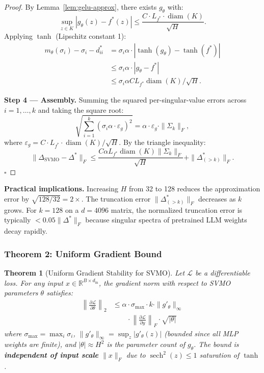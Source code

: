 \documentclass{scpe}
\newtheorem{theorem}{Theorem}[section]
\newcommand{\RR}{\mathbb{R}}
\newcommand{\sech}{\operatorname{sech}}
\newcommand{\diam}{\operatorname{diam}}
\begin{document}
\begin{proof}
By Lemma~\ref{lem:gelu-approx}, there exists $g_\theta$ with:
\begin{equation}
\sup_{z \in K} |g_\theta(z) - f^*(z)| \leq \frac{C \cdot L_{f^*} \cdot \diam(K)}{\sqrt{H}}.
\end{equation}
Applying $\tanh$ (Lipschitz constant 1):
\begin{align}
m_\theta(\sigma_i) - \sigma_i - d_{ii}^*
&= \sigma_i \alpha \cdot |\tanh(g_\theta) - \tanh(f^*)| \nonumber\\
&\leq \sigma_i \alpha \cdot |g_\theta - f^*| \nonumber\\
&\leq \sigma_i \alpha C L_{f^*} \diam(K) / \sqrt{H}.
\end{align}

\textbf{Step 4 --- Assembly.}
Summing the squared per-singular-value errors across $i=1,\dots,k$ and taking the square root:
\begin{equation}
\sqrt{\sum_{i=1}^k (\sigma_i \alpha \cdot \varepsilon_g)^2} = \alpha \cdot \varepsilon_g \cdot \|\Sigma_k\|_F,
\end{equation}
where $\varepsilon_g = C \cdot L_{f^*} \cdot \diam(K) / \sqrt{H}$. By the triangle inequality:
\begin{equation}
\|\Delta_{\text{SVMO}} - \Delta^*\|_F \leq \frac{C \alpha L_{f^*} \diam(K) \|\Sigma_k\|_F}{\sqrt{H}} + \|\Delta^*_{(>k)}\|_F.
\end{equation}
$\square$
\end{proof}

\textbf{Practical implications.} Increasing $H$ from 32 to 128 reduces the approximation error by $\sqrt{128/32} = 2\times$. The truncation error $\|\Delta^*_{(>k)}\|_F$ decreases as $k$ grows. For $k=128$ on a $d=4096$ matrix, the normalized truncation error is typically $<0.05\|\Delta^*\|_F$ because singular spectra of pretrained LLM weights decay rapidly.

\subsubsection{Theorem 2: Uniform Gradient Bound}

\begin{theorem}[Uniform Gradient Stability for SVMO]
\label{thm:svmo-grad}
Let $\mathcal{L}$ be a differentiable loss. For any input $x \in \RR^{B \times d_{\text{in}}}$, the gradient norm with respect to SVMO parameters $\theta$ satisfies:
\begin{align}
\left\|\frac{\partial\mathcal{L}}{\partial\theta}\right\|_2 &\leq \alpha \cdot \sigma_{\max} \cdot k \cdot \|g'_\theta\|_\infty\nonumber\\
&\qquad \cdot \left\|\frac{\partial\mathcal{L}}{\partial y}\right\|_F \cdot \sqrt{|\theta|}
\end{align}
where $\sigma_{\max} = \max_i \sigma_i$, $\|g'_\theta\|_\infty = \sup_z |g'_\theta(z)|$ (bounded since all MLP weights are finite), and $|\theta| \approx H^2$ is the parameter count of $g_\theta$. The bound is \textbf{independent of input scale} $\|x\|_F$ due to $\sech^2(z) \leq 1$ saturation of $\tanh$.
\end{theorem}
\end{document}
